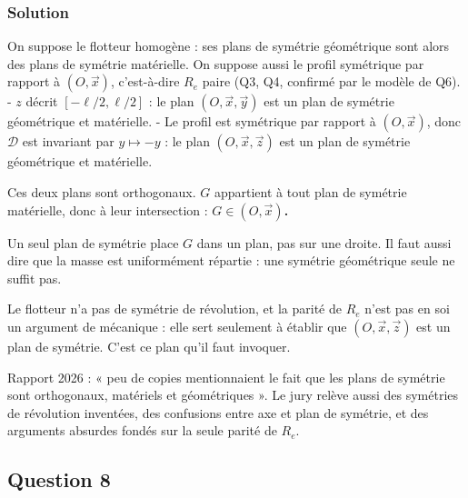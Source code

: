 \documentclass[11pt,a4paper]{article}
\begin{document}
\hypertarget{solution-6}{%
\subsubsection{Solution}\label{solution-6}}

On suppose le flotteur homogène : ses plans de symétrie géométrique sont alors des plans de symétrie matérielle. On suppose aussi le profil symétrique par rapport à \((O,\vec x)\), c'est-à-dire \(R_e\) paire (Q3, Q4, confirmé par le modèle de Q6).
- \(z\) décrit \([-\ell/2,\ell/2]\) : le plan \((O,\vec x,\vec y)\) est un plan de symétrie géométrique et matérielle.
- Le profil est symétrique par rapport à \((O,\vec x)\), donc \(\mathcal D\) est invariant par \(y\mapsto-y\) : le plan \((O,\vec x,\vec z)\) est un plan de symétrie géométrique et matérielle.

Ces deux plans sont orthogonaux. \(G\) appartient à tout plan de symétrie matérielle, donc à leur intersection : \textbf{\(G\in(O,\vec x)\).}

\begin{piege}

Un seul plan de symétrie place \(G\) dans un plan, pas sur une droite. Il faut aussi dire que la masse est uniformément répartie : une symétrie géométrique seule ne suffit pas.

\end{piege}

\begin{piege}

Le flotteur n'a pas de symétrie de révolution, et la parité de \(R_e\) n'est pas en soi un argument de mécanique : elle sert seulement à établir que \((O,\vec x,\vec z)\) est un plan de symétrie. C'est ce plan qu'il faut invoquer.

\end{piege}

\begin{jury}

Rapport 2026 : « peu de copies mentionnaient le fait que les plans de symétrie sont orthogonaux, matériels et géométriques ». Le jury relève aussi des symétries de révolution inventées, des confusions entre axe et plan de symétrie, et des arguments absurdes fondés sur la seule parité de \(R_e\).

\end{jury}

\hypertarget{question-8}{%
\subsection{Question 8}\label{question-8}}
\end{document}
